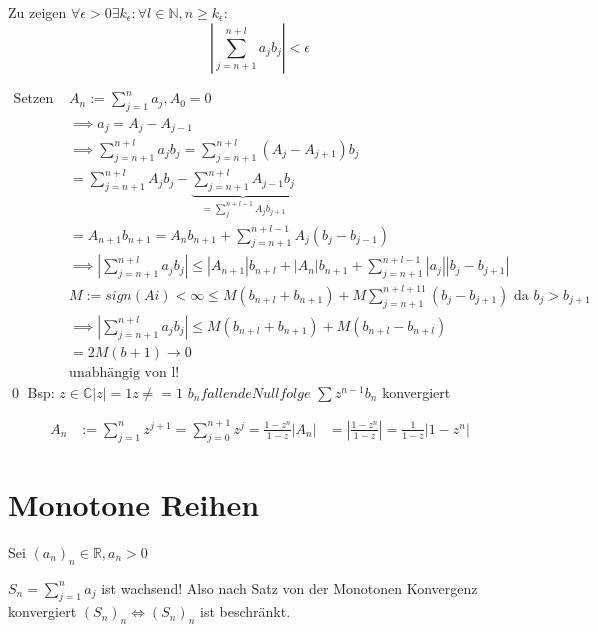 \documentclass[fleqn]{scrbook}
\renewenvironment{proof}{{\bfseries Beweis }}{\qed}
\begin{document}
\begin{proof}
 Zu zeigen $\forall \epsilon > 0 \exists k_\epsilon: \forall l \in \mathbb{N}, n \ge k_\epsilon:$
 $$| \sum_{j=n+1}^{n+l} a_j b_j | < \epsilon$$
 
 \begin{equation}
  \begin{split}
    \text{Setzen } & A_n := \sum_{j=1}^{n}a_j, A_0 = 0 \\
    & \implies a_j = A_j - A_{j-1} \\
    & \implies \sum_{j=n+1}^{n+l}  a_j b_j = \sum_{j=n+1}^{n+l} (A_j - A_{j+1}) b_j \\
    & = \sum_{j=n+1}^{n+l}  A_j b_j - \underbrace{\sum_{j=n+1}^{n+l}  A_{j-1} b_j}_{= \sum_j^{n+l-1} A_j b_{j+1}} \\
    & = A_{n+1} b_{n+1} = A_n b_{n+1} + \sum_{j=n+1}^{n+l-1} A_j (b_j - b_{j-1}) \\
    & \implies | \sum_{j=n+1}^{n+l}  a_j b_j | \le | A_{n+1} | b_{n+l} + |A_n| b_{n+1} + \sum_{j=n+1}^{n+l-1} |a_j| |b_j - b_{j+1}|  \\
    & M := sign(Ai) < \infty \le M (b_{n+l} + b_{n+1}) + M \sum_{j=n+1}^{n+l+11} (b_j - b_{j+1})  \text{  da  } b_j > b_{j+1} \\
    & \implies |\sum_{j=n+1}^{n+l} a_j b_j| \le M(b_{n+l} + b_{n+1}) + M (b_{n+l} - b_{n+l}) \\
    & = 2 M(b+1) \to 0 \\
    & \text{unabhängig von l!}
  \end{split}
 \end{equation}
\end{proof}
Bsp: $z \in \mathbb{C} |z| = 1 z \neq = 1$
$b_n fallende Nullfolge$
$\sum z^{n-1} b_n$ konvergiert

\begin{equation}
 \begin{split}
  A_n & := \sum_{j=1}^{n} z^{j+1} = \sum_{j=0}^{n+1}z^j = \frac{1-z^n}{1-z}
  |A_n| & = |\frac{1-z^n}{1-z}| = \frac{1}{1-z} | 1-z^n|
 \end{split}
\end{equation}

\section{Monotone Reihen}
Sei $(a_n)_n \in \mathbb{R}, a_n > 0$

$S_n = \sum_{j=1}^n a_j$ ist wachsend! Also nach Satz von der Monotonen Konvergenz konvergiert $(S_n)_n \Leftrightarrow (S_n)_n$ ist beschränkt.
\end{document}
